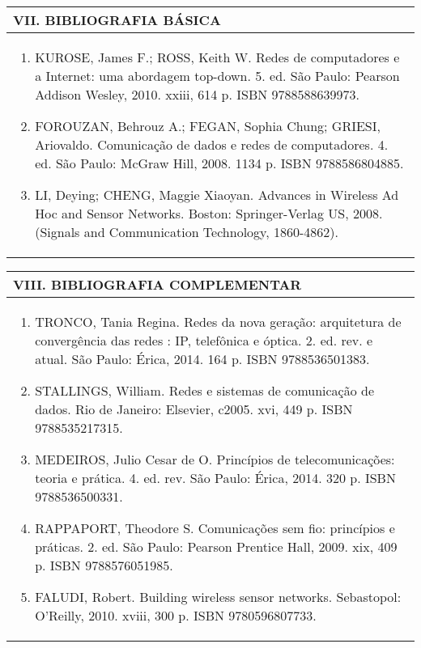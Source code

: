 \documentclass[12pt]{article}
\begin{document}


\begin{longtable}{|L{1.025\textwidth}|} \hline
%
{\bf VII. BIBLIOGRAFIA BÁSICA} \\ \hline
\begin{enumerate}
\item KUROSE, James F.; ROSS, Keith W. Redes de computadores e a Internet: uma abordagem top-down. 5. ed. São Paulo: Pearson Addison Wesley, 2010. xxiii, 614 p. ISBN 9788588639973.
\item FOROUZAN, Behrouz A.; FEGAN, Sophia Chung; GRIESI, Ariovaldo. Comunicação de dados e redes de computadores. 4. ed. São Paulo: McGraw Hill, 2008. 1134 p. ISBN 9788586804885. 
\item LI, Deying; CHENG, Maggie Xiaoyan. Advances in Wireless Ad Hoc and Sensor Networks. Boston: Springer-Verlag US, 2008. (Signals and Communication Technology, 1860-4862). 
\end{enumerate}
 \\ \hline
\end{longtable}



\begin{longtable}{|L{1.025\textwidth}|} \hline
%
{\bf VIII. BIBLIOGRAFIA COMPLEMENTAR} \\ \hline
\begin{enumerate}
\item TRONCO, Tania Regina. Redes da nova geração: arquitetura de convergência das redes : IP, telefônica e óptica. 2. ed. rev. e atual. São Paulo: Érica, 2014. 164 p. ISBN 9788536501383.
\item STALLINGS, William. Redes e sistemas de comunicação de dados. Rio de Janeiro: Elsevier, c2005. xvi, 449 p. ISBN 9788535217315. 
\item  MEDEIROS, Julio Cesar de O. Princípios de telecomunicações: teoria e prática. 4. ed. rev. São Paulo: Érica, 2014. 320 p. ISBN 9788536500331. 
\item  RAPPAPORT, Theodore S. Comunicações sem fio: princípios e práticas. 2. ed. São Paulo: Pearson Prentice Hall, 2009. xix, 409 p. ISBN 9788576051985. 
\item FALUDI, Robert. Building wireless sensor networks. Sebastopol: O'Reilly, 2010. xviii, 300 p. ISBN 9780596807733. 
%
\end{enumerate}
 \\ \hline
\end{longtable}



\end{document}
